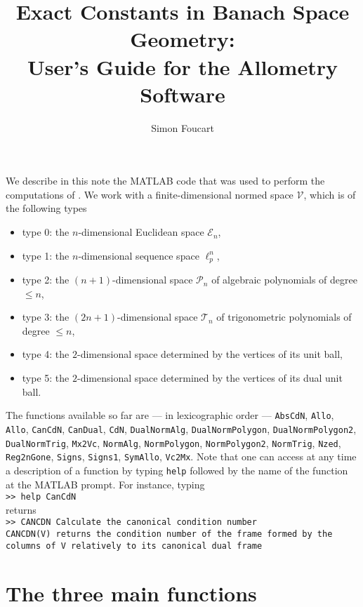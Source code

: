 \documentclass[11pt,leqno]{article}
\title{Exact Constants in Banach Space Geometry:\\ User's Guide for the Allometry Software}
\author{Simon Foucart}
\date{}
\theoremstyle{plain}
\theoremstyle{definition}
\theoremstyle{remark}
\newcommand{\EE}{\mathcal{E}}
\newcommand{\PP}{\mathcal{P}}
\newcommand{\TT}{\mathcal{T}}
\newcommand{\VV}{\mathcal{V}}
\begin{document}
 \maketitle
 
 We describe in this note the MATLAB code that was used to perform the computations of  \cite{paper8}.
We work with a finite-dimensional normed space $\VV$, which is of the following types
 \begin{itemize}
 \item type 0: the $n$-dimensional Euclidean space $\EE_n$,
 \item type 1: the $n$-dimensional sequence space $\ell_p^n$,
 \item type 2: the $(n+1)$-dimensional space $\PP_n$ of algebraic polynomials of degree $\le n$,
 \item type 3: the $(2n+1)$-dimensional space $\TT_n$ of trigonometric polynomials of degree $\le n$,
 \item type 4: the $2$-dimensional space determined by the vertices of its unit ball,
  \item type 5: the $2$-dimensional space determined by the vertices of its dual unit ball. 
 \end{itemize}
 The functions available so far are --- in lexicographic order ---  {\tt \small AbsCdN}, {\tt \small Allo}, {\tt \small Allo}, {\tt \small CanCdN}, {\tt \small CanDual}, {\tt \small CdN}, {\tt \small DualNormAlg}, {\tt \small DualNormPolygon}, {\tt \small DualNormPolygon2}, {\tt \small DualNormTrig}, {\tt \small Mx2Vc}, {\tt \small NormAlg}, {\tt \small NormPolygon}, {\tt \small NormPolygon2}, {\tt \small NormTrig}, {\tt \small Nzed}, {\tt \small Reg2nGone}, {\tt \small Signs}, {\tt \small Signs1}, {\tt \small SymAllo}, {\tt \small Vc2Mx}.
 Note that one can access at any time  a description of a function by typing {\tt help} followed by the name of the function at the MATLAB prompt. For instance, typing\\
{\tt \small >> help CanCdN}\\
returns\\
{\tt \small >>   CANCDN Calculate the canonical condition number\\
  \phantom{>>} CANCDN(V) returns the condition number of the frame formed by the columns of V relatively to its canonical dual frame} 
 
 \section{The three main functions}
 
\end{document}

